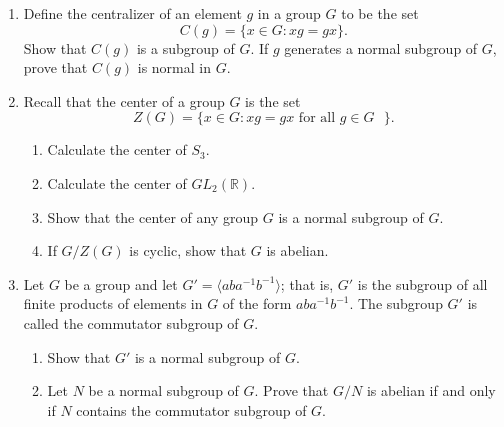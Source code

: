 {\begin{enumerate}
\bf\item\rm
Define the {\bfi centralizer\/} of an element $g$ in a group $G$
to be the set  
\[
C(g) = \{ x \in G : xg = gx \}.
\]
Show that $C(g)$ is a subgroup of $G$.  If $g$ generates a normal
subgroup of $G$, prove that $C(g)$ is normal in $G$.
 
 
\bf\item\rm
Recall that the {\bfi center\/} of a group $G$ is
the set 
\[
Z(G) = \{ x \in G : xg = gx \mbox{ for all $g \in G$ } \}.
\]
\begin{enumerate}
 
 \bf\item\rm
Calculate the center of $S_3$.
 
 \bf\item\rm
Calculate the center of $GL_2 ( {\mathbb R} )$.
 
 \bf\item\rm
Show that the center of any group $G$ is a normal subgroup of $G$. 
 
 \bf\item\rm
If $G / Z(G)$ is cyclic, show that $G$ is abelian.
 
\end{enumerate}
 
 
 
 
\bf\item\rm
Let $G$ be a group and let $G' = \langle aba^{- 1} b^{-1} \rangle$;
that is, $G'$ is the subgroup of all finite products of elements in
$G$ of the form $aba^{-1}b^{-1}$.  The subgroup $G'$ is called the
{\bfi commutator
subgroup\/}\label{commutatorsubgroup} of $G$.  
\begin{enumerate}
 
 \bf\item\rm
Show that $G'$ is a normal subgroup of $G$.

 \bf\item\rm
Let $N$ be  a normal subgroup of $G$.  Prove that $G/N$ is abelian if
and only if $N$ contains the commutator subgroup of $G$.
 
\end{enumerate}


\end{enumerate}}
